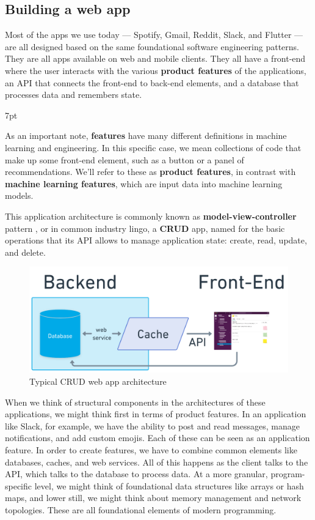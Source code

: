 \documentclass[11pt, table]{diazessay} %
\newenvironment{formal}{%
  \def\FrameCommand{%
	\hspace{1pt}%
	{\color{w_lightblue}\vrule width 2pt}%
	{\color{formalshade}\vrule width 4pt}%
	\colorbox{formalshade}%
  }%
  \MakeFramed{\advance\hsize-\width\FrameRestore}%
  \noindent\hspace{-4.55pt}%
  \begin{adjustwidth}{}{7pt}%
  \vspace{2pt}\vspace{2pt}%
}
{%
  \vspace{2pt}\end{adjustwidth}\endMakeFramed%
}
\begin{document}
\begin{sloppypar}
\subsection{Building a web app}

 Most of the apps we use today --- Spotify, Gmail, Reddit, Slack, and Flutter --- are all designed based on the same foundational software engineering patterns. They are all apps available on web and mobile clients. They all have a front-end where the user interacts with the various \textbf{product features} of the applications, an API that connects the front-end to back-end elements, and a database that processes data and remembers state.
 
 \begin{formal}
 As an important note, \textbf{features} have many different definitions in machine learning and engineering. In this specific case, we mean collections of code that make up some front-end element, such as a button or a panel of recommendations. We'll refer to these as \textbf{product features}, in contrast with \textbf{machine learning features}, which are input data into machine learning models.
  \end{formal}
 
 This application architecture is commonly known as \textbf{model-view-controller} pattern  \citep{fowler2012patterns}, or in common industry lingo, a \textbf{CRUD} app, named for the basic operations that its API allows to manage application state: create, read, update, and delete.
 
\begin{figure}[H]
\centering
\includegraphics[width=.9\textwidth]{figures/web_service.png}
\caption{Typical CRUD web app architecture}
\end{figure}

When we think of structural components in the architectures of these applications, we might think first in terms of product features. In an application like Slack, for example, we have the ability to post and read messages, manage notifications, and add custom emojis. Each of these can be seen as an application feature. In order to create features, we have to combine common elements like databases, caches, and web services. All of this happens as the client talks to the API, which talks to the database to process data. At a more granular, program-specific level, we might think of foundational data structures like arrays or hash maps, and lower still, we might think about memory management and network topologies. These are all foundational elements of modern programming.


\end{sloppypar}
\end{document}
